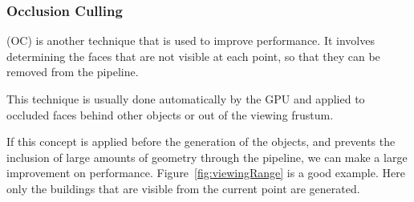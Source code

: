 \subsubsection{Occlusion Culling} %
\label{ssub:occlusion_culling}

(OC) is another technique that is used to improve performance. It involves determining the faces that are not visible at each point, so that they can be removed from the pipeline.

This technique is usually done automatically by the GPU and applied to occluded faces behind other objects or out of the viewing frustum.

If this concept is applied before the generation of the objects, and prevents the inclusion of large amounts of geometry through the pipeline, we can make a large improvement on performance. Figure~\ref{fig:viewingRange} is a good example. Here only the buildings that are visible from the current point are generated.




